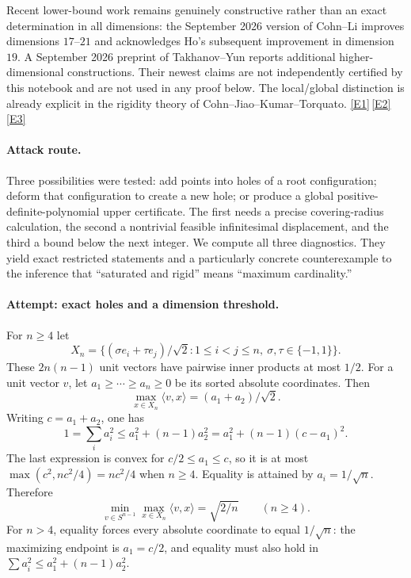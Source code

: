 \documentclass[11pt,a4paper]{article}
\newcommand{\eref}[2]{\hyperlink{extra:#1:#2}{[E#2]}}
\numberwithin{equation}{section}
\begin{document}
Recent lower-bound work remains genuinely constructive rather than an
exact determination in all dimensions: the September 2026 version of
Cohn--Li improves dimensions $17$--$21$ and acknowledges Ho's subsequent
improvement in dimension $19$. A September 2026 preprint of Takhanov--Yun
reports additional higher-dimensional constructions. Their newest claims
are not independently certified by this notebook and are not used in any
proof below. The local/global distinction is already explicit in the
rigidity theory of Cohn--Jiao--Kumar--Torquato. \eref{statement}{1}\,\eref{statement}{2}\,\eref{statement}{3}

\paragraph{Attack route.}
Three possibilities were tested: add points into holes of a root
configuration; deform that configuration to create a new hole; or produce
a global positive-definite-polynomial upper certificate. The first needs
a precise covering-radius calculation, the second a nontrivial feasible
infinitesimal displacement, and the third a bound below the next integer.
We compute all three diagnostics. They yield exact restricted statements
and a particularly concrete counterexample to the inference that
``saturated and rigid'' means ``maximum cardinality.''

\paragraph{Attempt: exact holes and a dimension threshold.}
For $n\geq4$ let
\[
 X_n=\{(\sigma e_i+\tau e_j)/\sqrt2:
           1\leq i<j\leq n,\ \sigma,\tau\in\{-1,1\}\}.
\]
These $2n(n-1)$ unit vectors have pairwise inner products at most $1/2$.
For a unit vector $v$, let $a_1\geq\cdots\geq a_n\geq0$ be its sorted
absolute coordinates. Then
\begin{equation}\label{statement:support}
 \max_{x\in X_n}\langle v,x\rangle=(a_1+a_2)/\sqrt2.
\end{equation}
Writing $c=a_1+a_2$, one has
\[
 1=\sum_i a_i^2\leq a_1^2+(n-1)a_2^2
             =a_1^2+(n-1)(c-a_1)^2.
\]
The last expression is convex for $c/2\leq a_1\leq c$, so it is at most
$\max(c^2,nc^2/4)=nc^2/4$ when $n\geq4$. Equality is attained by
$a_i=1/\sqrt n$. Therefore
\begin{equation}\label{statement:cover}
 \min_{v\in S^{n-1}}\max_{x\in X_n}\langle v,x\rangle
       =\sqrt{2/n}\qquad(n\geq4).
\end{equation}
For $n>4$, equality forces every absolute coordinate to equal
$1/\sqrt n$: the maximizing endpoint is $a_1=c/2$, and equality must
also hold in $\sum a_i^2\leq a_1^2+(n-1)a_2^2$.
\end{document}
